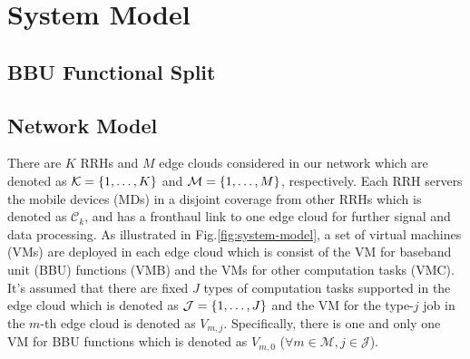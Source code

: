 \section{System Model}
\label{sec:model}

\subsection{BBU Functional Split}

\subsection{Network Model}
There are $K$ RRHs and $M$ edge clouds considered in our network which are denoted as $\mathcal{K}=\{1,\dots,K\}$ and $\mathcal{M}=\{1,\dots,M\}$, respectively.
Each RRH servers the mobile devices (MDs) in a disjoint coverage from other RRHs which is denoted as $\mathcal{C}_{k}$, and has a fronthaul link to one edge cloud for further signal and data processing.
As illustrated in Fig.\ref{fig:system-model}, a set of virtual machines (VMs) are deployed in each edge cloud which is consist of the VM for baseband unit (BBU) functions (VMB) and the VMs for other computation tasks (VMC).
It's assumed that there are fixed $J$ types of computation tasks supported in the edge cloud which is denoted as $\mathcal{J}=\{1,\dots,J\}$ and the VM for the type-$j$ job in the $m$-th edge cloud is denoted as $V_{m,j}$.
Specifically, there is one and only one VM for BBU functions which is denoted as $V_{m,0}$ ($\forall m\in\mathcal{M},j\in\mathcal{J}$).

